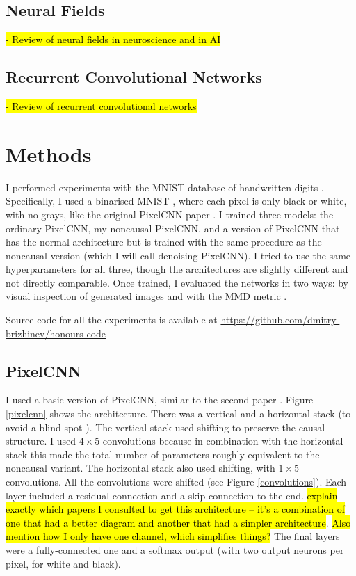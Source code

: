 \documentclass[10pt,a4paper]{article}
\begin{document}
\subsection{Neural Fields}

\hl{- Review of neural fields in neuroscience and in AI}

\subsection{Recurrent Convolutional Networks}

\hl{- Review of recurrent convolutional networks}
\citet{videopixel}

\section{Methods}

I performed experiments with the MNIST database of handwritten digits \citep{mnist}. Specifically, I used a binarised MNIST \citep{binarisedmnist}, where each pixel is only black or white, with no grays, like the original PixelCNN paper \citep{pixelcnn1}. I trained three models: the ordinary PixelCNN, my noncausal PixelCNN, and a version of PixelCNN that has the normal architecture but is trained with the same procedure as the noncausal version (which I will call denoising PixelCNN). I tried to use the same hyperparameters for all three, though the architectures are slightly different and not directly comparable. Once trained, I evaluated the networks in two ways: by visual inspection of generated images and with the MMD metric \citep{mmd,ganmetrics}.

Source code for all the experiments is available at \url{https://github.com/dmitry-brizhinev/honours-code}

\subsection{PixelCNN}

I used a basic version of PixelCNN, similar to the second paper \citep{pixelcnn2}. Figure \ref{pixelcnn} shows the architecture. There was a vertical and a horizontal stack (to avoid a blind spot \citep{pixelcnn2}). The vertical stack used shifting to preserve the causal structure. I used $4\times 5$ convolutions because in combination with the horizontal stack this made the total number of parameters roughly equivalent to the noncausal variant. The horizontal stack also used shifting, with $1\times 5$ convolutions. All the convolutions were shifted (see Figure \ref{convolutions}). Each layer included a residual connection and a skip connection to the end. \hl{explain exactly which papers I consulted to get this architecture -- it's a combination of one that had a better diagram and another that had a simpler architecture}. \hl{Also mention how I only have one channel, which simplifies things?} The final layers were a fully-connected one and a softmax output (with two output neurons per pixel, for white and black).
\end{document}
